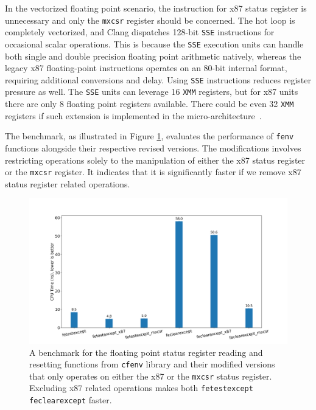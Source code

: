 \documentclass[logo,bsc,singlespacing,parskip]{infthesis}
\newcommand{\mxcsr}{\texttt{mxcsr}}
\newcommand{\xmm}{\texttt{XMM}}
\begin{document}
In the vectorized floating point scenario, the instruction for x87 status
register is unnecessary and only the \mxcsr{} register should be concerned. The
hot loop is completely vectorized, and Clang dispatches 128-bit \texttt{SSE}
instructions for occasional scalar operations. This is because the \texttt{SSE}
execution units can handle both single and double precision floating point
arithmetic natively, whereas the legacy x87 floating-point instructions operates
on an 80-bit internal format, requiring additional conversions and delay. Using
\texttt{SSE} instructions reduces register pressure as well. The \texttt{SSE}
units can leverage 16 \xmm{} registers, but for x87 units there are only 8
floating point registers available. There could be even 32 \xmm{} registers if
such extension is implemented in the micro-architecture~\cite{x87-bad}. 

The benchmark, as illustrated in Figure \ref{plot_fenv}, evaluates the
performance of \texttt{fenv} functions alongside their respective revised
versions. The modifications involves restricting operations solely to the
manipulation of either the x87 status register or the \mxcsr{} register. It
indicates that it is significantly faster if we remove x87 status register
related operations. 

\begin{figure}[H]\captionsetup{name=Figure}
    \begin{center}
    \includegraphics[width=\linewidth]{image/bench_fenv.png}
    \end{center}
    \caption{A benchmark for the floating point status register reading and
resetting functions from \texttt{cfenv} library and their modified versions that
only operates on either the x87 or the \mxcsr{} status register. Excluding x87
related operations makes both \texttt{fetestexcept} \texttt{feclearexcept}
faster.}
    \label{plot_fenv}
\end{figure}
\normalsize
\end{document}
